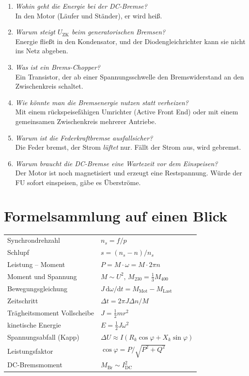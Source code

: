 \documentclass[11pt,a4paper]{article}
\begin{document}
\begin{enumerate}[label=\textbf{F\arabic*:},leftmargin=2.2em]
  Ohne Bewegung wird nichts induziert.
\item \emph{Wohin geht die Energie bei der DC-Bremse?}\\
  In den Motor (Läufer und Ständer), er wird heiß.
\item \emph{Warum steigt $U_\mathrm{ZK}$ beim generatorischen Bremsen?}\\
  Energie fließt in den Kondensator, und der Diodengleichrichter kann sie nicht ins Netz abgeben.
\item \emph{Was ist ein Brems-Chopper?}\\
  Ein Transistor, der ab einer Spannungsschwelle den Bremswiderstand an den Zwischenkreis schaltet.
\item \emph{Wie könnte man die Bremsenergie nutzen statt verheizen?}\\
  Mit einem rückspeisefähigen Umrichter (Active Front End) oder mit einem gemeinsamen
  Zwischenkreis mehrerer Antriebe.
\item \emph{Warum ist die Federkraftbremse ausfallsicher?}\\
  Die Feder bremst, der Strom \emph{lüftet} nur. Fällt der Strom aus, wird gebremst.
\item \emph{Warum braucht die DC-Bremse eine Wartezeit vor dem Einspeisen?}\\
  Der Motor ist noch magnetisiert und erzeugt eine Restspannung. Würde der FU sofort
  einspeisen, gäbe es Überströme.
\end{enumerate}

\section{Formelsammlung auf einen Blick}
\begin{center}
\renewcommand{\arraystretch}{1.5}
\begin{tabular}{@{}ll@{}}
\toprule
Synchrondrehzahl & $n_s = f/p$\\
Schlupf & $s = (n_s - n)/n_s$\\
Leistung -- Moment & $P = M\cdot\omega = M\cdot 2\pi n$\\
Moment und Spannung & $M \sim U^2$, \quad $M_{230} = \frac13 M_{400}$\\
Bewegungsgleichung & $J\,\mathrm d\omega/\mathrm dt = M_\mathrm{Mot} - M_\mathrm{Last}$\\
Zeitschritt & $\Delta t = 2\pi J \Delta n / M$\\
Trägheitsmoment Vollscheibe & $J = \frac12 m r^2$\\
kinetische Energie & $E = \frac12 J\omega^2$\\
Spannungsabfall (Kapp) & $\Delta U \approx I(R_k\cos\varphi + X_k\sin\varphi)$\\
Leistungsfaktor & $\cos\varphi = P/\sqrt{P^2+Q^2}$\\
DC-Bremsmoment & $M_\mathrm{Br} \sim I_\mathrm{DC}^2$\\
\bottomrule
\end{tabular}
\end{center}
\end{document}

